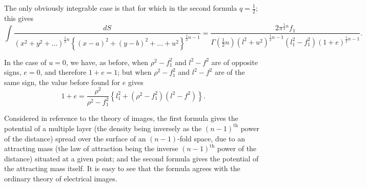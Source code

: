 \documentclass[11pt,a4paper]{article}
\theoremstyle{plain}
\begin{document}
The only obviously integrable case is that for which in the second formula $q = \frac{1}{2}$; this gives
\[\int \frac{dS}{(x^2+y^2+\ldots)^{\frac{1}{2}n} \left\{(x-a)^2 + (y-b)^2 + \ldots + u^2\right\}^{\frac{1}{2}n-1}} = \frac{2\pi^{\frac{1}{2}n}f_1}{\Gamma(\tfrac{1}{2}n)(l^2+u^2)^{\frac{1}{2}n-1}(l_1^2-f_1^2)(1+e)^{\frac{1}{2}n-1}}.\]

In the case of $u = 0$, we have, as before, when $\rho^2 - f_1^2$ and $l^2 - f^2$ are of opposite signs, $e = 0$, and therefore $1+e = 1$; but when $\rho^2 - f_1^2$ and $l^2 - f^2$ are of the same sign, the value before found for $e$ gives
\[1 + e = \frac{\rho^2}{\rho^2 - f_1^2} \left\{ l_1^2 + (\rho^2 - f_1^2)(l^2 - f^2) \right\}.\]

Considered in reference to the theory of images, the first formula gives the potential of a multiple layer (the density being inversely as the $(n-1)^{\text{th}}$ power of the distance) spread over the surface of an $(n-1)$-fold space, due to an attracting mass (the law of attraction being the inverse $(n-1)^{\text{th}}$ power of the distance) situated at a given point; and the second formula gives the potential of the attracting mass itself. It is easy to see that the formula agrees with the ordinary theory of electrical images.
\clearpage
\end{document}
